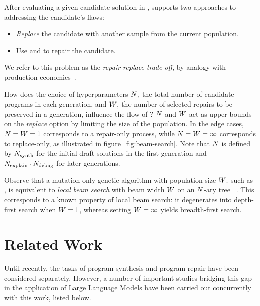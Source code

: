 After evaluating a given candidate solution in \execute{}, \method{} supports two approaches to addressing the candidate's flaws:
\begin{itemize}
  \item \emph{Replace} the candidate with another sample from the current population.
  \item Use \instruct{} and \debug{} to repair the candidate.
\end{itemize}
We refer to this problem as the \emph{repair-replace trade-off}, by analogy with production economics~\cite{jack2000:optimal}. 

How does the choice of hyperparameters $N{},$ the total number of candidate programs in each generation, and $W{},$ the number of selected repairs to be preserved in a generation, influence the flow of \method{}?
$N$ and $W{}$ act as upper bounds on the \emph{replace} option by limiting the size of the population.
In the edge cases, $N{} = W{} = 1$ corresponds to a repair-only process, while $N{} = W{} = \infty$ corresponds to replace-only, as illustrated in figure~\ref{fig:beam-search}. 
Note that $N{}$ is defined by $N_\text{synth}{}$ for the initial draft solutions in the first generation and $N_\text{explain}{} \cdot N_\text{debug}{}$ for later generations. 

Observe that a mutation-only genetic algorithm with population size $W{},$ such as \method{}, is equivalent to \emph{local beam search} with beam width $W{}$ on an $N{}$-ary tree ~\cite[Section 4.1.4]{russell2010:artificial}. This corresponds to a known property of local beam search: it degenerates into depth-first search when $W{} = 1$, whereas setting $W{} = \infty$ yields breadth-first search.


\newpage \section{Related Work}
\label{sec:related-work}

Until recently, the tasks of program synthesis \cite{gulwaniProgramSynthesis2017} and program repair \cite{gouesAutomatedProgramRepair2019, petke2018:genetic} have been considered separately.
However, a number of important studies bridging this gap in the application of Large Language Models have been carried out concurrently with this work, listed below.

